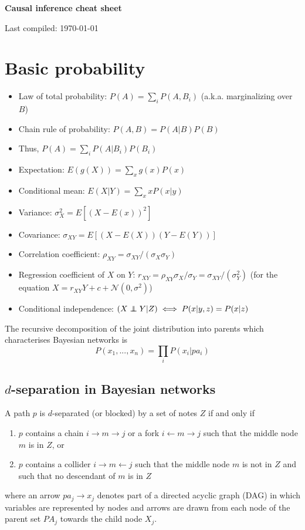 \documentclass[11pt]{article}
\numberwithin{equation}{section}
\newcommand\indep{\protect\mathpalette{\protect\independenT}{\perp}}
\def\independenT#1#2{\mathrel{\rlap{$#1#2$}\mkern2mu{#1#2}}}
\begin{document}
\begin{flushleft}
\textbf{\Large Causal inference cheat sheet}
\end{flushleft}

\begin{flushleft}
Last compiled: \today
\end{flushleft}


\section{Basic probability}

\begin{itemize}[noitemsep]
\item Law of total probability: $P(A) = \sum_i P(A, B_i)$ (a.k.a. marginalizing over $B$)
\item Chain rule of probability: $P(A,B) = P(A|B) P(B)$
\item Thus, $P(A) = \sum_i P(A|B_i) P(B_i)$
\item Expectation: $E(g(X)) = \sum_x g(x) P(x)$
\item Conditional mean: $E(X|Y) = \sum_x x P(x|y)$
\item Variance: $\sigma_X^2 = E[(X - E(x))^2]$
\item Covariance: $\sigma_{XY} = E[(X-E(X))(Y-E(Y))]$
\item Correlation coefficient: $\rho_{XY}=\sigma_{XY}/(\sigma_X \sigma_Y)$
\item Regression coefficient of $X$ on $Y$: $r_{XY} = \rho_{XY} \sigma_X/\sigma_Y = \sigma_{XY}/(\sigma_Y^2)$ (for the equation $X = r_{XY} Y + c + \mathcal{N}(0, \sigma^2)$)
\item Conditional independence: $(X \indep Y | Z) \iff P(x|y,z) = P(x|z) $
\end{itemize}

The recursive decomposition of the joint distribution into parents which characterises Bayesian networks is
\begin{equation}
P(x_1, ..., x_n) = \prod_i P(x_i|pa_i) \label{eq:bayes-net-char}
\end{equation}

\subsection{$d$-separation in Bayesian networks}
A path $p$ is $d$-separated (or blocked) by a set of notes $Z$ if and only if
\begin{enumerate}[noitemsep]
\item $p$ contains a chain $i \rightarrow m \rightarrow j$ or a fork $i \leftarrow m \rightarrow j$ such that the middle node $m$ is in $Z$, or
\item $p$ contains a collider $i \rightarrow m \leftarrow j$ such that the middle node $m$ is not in $Z$ and such that no descendant of $m$ is in $Z$
\end{enumerate}
where an arrow $pa_j \rightarrow x_j$ denotes part of a directed acyclic graph (DAG) in which variables are represented by nodes and arrows are drawn from each node of the parent set $PA_j$ towards the child node $X_j$.
\end{document}
